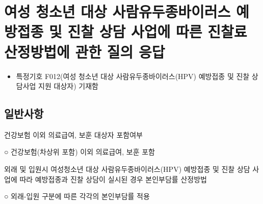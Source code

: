 \section{여성 청소년 대상 사람유두종바이러스 예방접종 및 진찰 \cntrdot{} 상담 사업에 따른 진찰료 산정방법에 관한 질의 응답}
{
\begin{itemize}\tightlist
\item 특정기호 F012(여성 청소년 대상 사람유두종바이러스(HPV) 예방접종 및 진찰\cntrdot{} 상담사업 지원  대상자) 기재함
\end{itemize}
}

\subsection{일반사항}
건강보험 이외 의료급여, 보훈 대상자 포함여부
\begin{quotebox}
 ○ 건강보험(차상위 포함) 이외 의료급여, 보훈 포함
\end{quotebox} 
외래 및 입원시 여성청소년 대상 사람유두종바이러스(HPV) 예방접종 및 진찰\cntrdot{}  상담 사업에 따라 예방접종과 진찰\cntrdot{} 상담이 실시된 경우 본인부담률 산정방법
\begin{quotebox}
○ 외래-입원 구분에 따른 각각의 본인부담률 적용
\end{quotebox}

